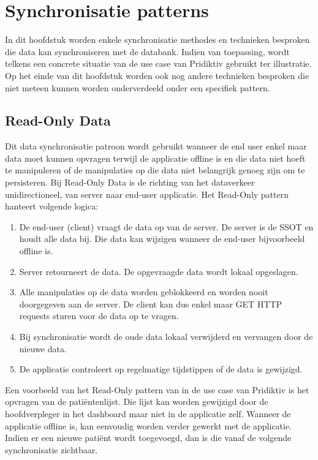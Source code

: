 
\chapter{Synchronisatie patterns}
\label{ch:synchronisatiemethdodes}


In dit hoofdstuk worden enkele synchronisatie methodes en technieken besproken die data kan synchroniseren met de databank. Indien van toepassing, wordt telkens een concrete situatie van de use case van Pridiktiv gebruikt ter illustratie. Op het einde van dit hoofdstuk worden ook nog andere technieken besproken die niet meteen kunnen worden onderverdeeld onder een specifiek pattern.

\section{Read-Only Data}
Dit data synchronisatie patroon wordt gebruikt wanneer de end user enkel maar data moet kunnen opvragen terwijl de applicatie offline is en die data niet hoeft te manipuleren of de manipulaties op die data niet belangrijk genoeg zijn om te persisteren. Bij Read-Only Data is de richting van het dataverkeer unidirectioneel, van server naar end-user applicatie. Het Read-Only pattern hanteert volgende logica:
\begin{enumerate}
\item De end-user (client) vraagt de data op van de server. De server is de SSOT en houdt alle data bij. Die data kan wijzigen wanneer de end-user bijvoorbeeld offline is.
\item Server retourneert de data. De opgevraagde data wordt lokaal opgeslagen.
\item Alle manipulaties op de data worden geblokkeerd en worden nooit doorgegeven aan de server. De client kan dus enkel maar GET HTTP requests sturen voor de data op te vragen.
\item Bij synchronisatie wordt de oude data lokaal verwijderd en vervangen door de nieuwe data.
\item De applicatie controleert op regelmatige tijdstippen of de data is gewijzigd.
\end{enumerate}
Een voorbeeld van het Read-Only pattern van in de use case van Pridiktiv is het opvragen van de pati\"entenlijst. Die lijst kan worden gewijzigd door de hoofdverpleger in het dashboard maar niet in de applicatie zelf. Wanneer de applicatie offline is, kan eenvoudig worden verder gewerkt met de applicatie. Indien er een nieuwe pati\"ent wordt toegevoegd, dan is die vanaf de volgende synchronisatie zichtbaar.
